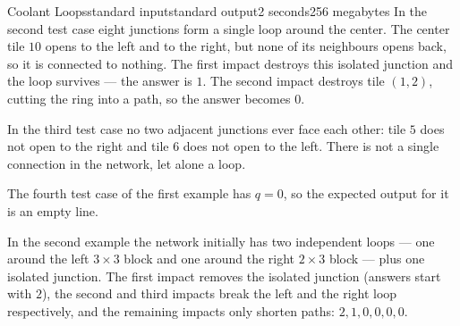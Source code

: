 \begin{problem}{Coolant Loops}{standard input}{standard output}{2 seconds}{256 megabytes}
In the second test case eight junctions form a single loop around the center. The center tile $10$ opens to the left and to the right, but none of its neighbours opens back, so it is connected to nothing. The first impact destroys this isolated junction and the loop survives --- the answer is $1$. The second impact destroys tile $(1,2)$, cutting the ring into a path, so the answer becomes $0$.

In the third test case no two adjacent junctions ever face each other: tile $5$ does not open to the right and tile $6$ does not open to the left. There is not a single connection in the network, let alone a loop.

The fourth test case of the first example has $q = 0$, so the expected output for it is an empty line.

In the second example the network initially has two independent loops --- one around the left $3 \times 3$ block and one around the right $2 \times 3$ block --- plus one isolated junction. The first impact removes the isolated junction (answers start with $2$), the second and third impacts break the left and the right loop respectively, and the remaining impacts only shorten paths: $2, 1, 0, 0, 0, 0$.


\end{problem}

